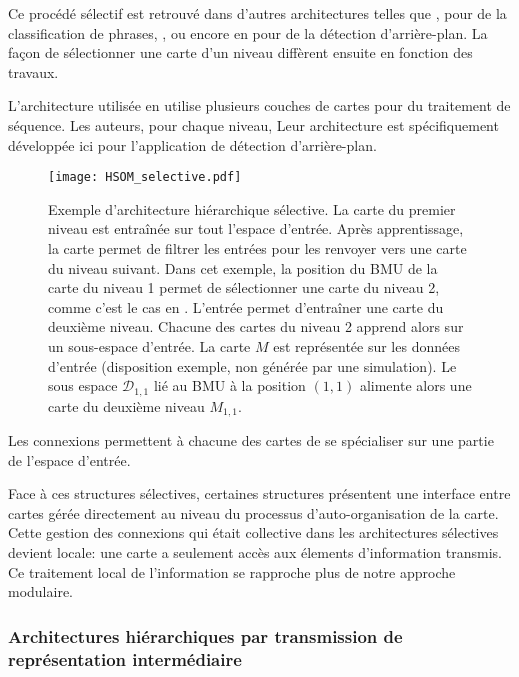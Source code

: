 \documentclass[../main]{subfiles}
\begin{document}
Ce procédé sélectif est retrouvé dans d'autres architectures telles que \cite{suganthan_pattern_2001}, \cite{miikkulainen_script_1992} pour de la classification de phrases, \cite{dittenbach_growing_2000,ordonez_hierarchical_2010}, ou encore en \cite{zhao_stacked_2015} pour de la détection d'arrière-plan. La façon de sélectionner une carte d'un niveau diffèrent ensuite en fonction des travaux. 

L'architecture utilisée en \cite{zhao_stacked_2015} utilise plusieurs couches de cartes pour du traitement de séquence. Les auteurs, pour chaque niveau,
Leur architecture est spécifiquement développée ici pour l'application de détection d'arrière-plan.

\begin{figure}
    \texttt{[image: HSOM\_selective.pdf]}
    \caption{Exemple d'architecture hiérarchique sélective. La carte du premier niveau est entraînée sur tout l'espace d'entrée. Après apprentissage, la carte permet de filtrer les entrées pour les renvoyer vers une carte du niveau suivant. Dans cet exemple, la position du BMU de la carte du niveau 1 permet de sélectionner une carte du niveau 2, comme c'est le cas en \cite{barbalho_hierarchical_2001}. 
    L'entrée permet d'entraîner une carte du deuxième niveau. Chacune des cartes du niveau 2 apprend alors sur un sous-espace d'entrée. La carte $M$ est représentée sur les données d'entrée (disposition exemple, non générée par une simulation). Le sous espace $\mathcal{D}_{1,1}$ lié au BMU à la position $(1,1)$ alimente alors une carte du deuxième niveau $M_{1,1}$.
    \label{fig:hsom_selective}}
\end{figure}


Les connexions permettent à chacune des cartes de se spécialiser sur une partie de l'espace d'entrée.

Face à ces structures sélectives, certaines structures présentent une interface entre cartes gérée directement au niveau du processus d'auto-organisation de la carte.
Cette gestion des connexions qui était collective dans les architectures sélectives devient locale: une carte a seulement accès aux élements d'information transmis. Ce traitement local de l'information se rapproche plus de notre approche modulaire.

\subsubsection{Architectures hiérarchiques par transmission de représentation intermédiaire}
\end{document}

